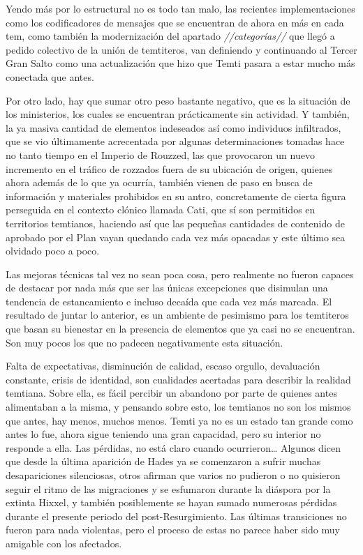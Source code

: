 \documentclass[
  spanish,
]{book}
\begin{document}
Yendo más por lo estructural no es todo tan malo, las recientes implementaciones como los codificadores de mensajes que se encuentran de ahora en más en cada tem, como también la modernización del apartado \emph{//categorías//} que llegó a pedido colectivo de la unión de temtiteros, van definiendo y continuando al Tercer Gran Salto como una actualización que hizo que Temti pasara a estar mucho más conectada que antes.

Por otro lado, hay que sumar otro peso bastante negativo, que es la situación de los ministerios, los cuales se encuentran prácticamente sin actividad. Y también, la ya masiva cantidad de elementos indeseados así como individuos infiltrados, que se vio últimamente acrecentada por algunas determinaciones tomadas hace no tanto tiempo en el Imperio de Rouzzed, las que provocaron un nuevo incremento en el tráfico de rozzados fuera de su ubicación de origen, quienes ahora además de lo que ya ocurría, también vienen de paso en busca de información y materiales prohibidos en su antro, concretamente de cierta figura perseguida en el contexto clónico llamada Cati, que sí son permitidos en territorios temtianos, haciendo así que las pequeñas cantidades de contenido de aprobado por el Plan vayan quedando cada vez más opacadas y este último sea olvidado poco a poco.

Las mejoras técnicas tal vez no sean poca cosa, pero realmente no fueron capaces de destacar por nada más que ser las únicas excepciones que disimulan una tendencia de estancamiento e incluso decaída que cada vez más marcada. El resultado de juntar lo anterior, es un ambiente de pesimismo para los temtiteros que basan su bienestar en la presencia de elementos que ya casi no se encuentran. Son muy pocos los que no padecen negativamente esta situación.

Falta de expectativas, disminución de calidad, escaso orgullo, devaluación constante, crisis de identidad, son cualidades acertadas para describir la realidad temtiana. Sobre ella, es fácil percibir un abandono por parte de quienes antes alimentaban a la misma, y pensando sobre esto, los temtianos no son los mismos que antes, hay menos, muchos menos. Temti ya no es un estado tan grande como antes lo fue, ahora sigue teniendo una gran capacidad, pero su interior no responde a ella. Las pérdidas, no está claro cuando ocurrieron\ldots{} Algunos dicen que desde la última aparición de Hades ya se comenzaron a sufrir muchas desapariciones silenciosas, otros afirman que varios no pudieron o no quisieron seguir el ritmo de las migraciones y se esfumaron durante la diáspora por la extinta Hixxel, y también posiblemente se hayan sumado numerosas pérdidas durante el presente periodo del post-Resurgimiento. Las últimas transiciones no fueron para nada violentas, pero el proceso de estas no parece haber sido muy amigable con los afectados.
\end{document}
